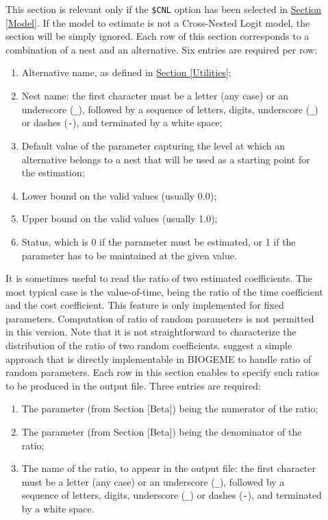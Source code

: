 \documentclass[12pt]{memoir}
\begin{document}
\begin{description}
   \item[]  This section is relevant only if the
      \verb+$CNL+ option has been selected in \hyperlink{Model}{Section [Model]}. If the model to estimate is not a Cross-Nested Logit model, the section will be
      simply ignored. 
      Each row of this section corresponds to a combination of a nest and an alternative. Six entries are required per row:
      \begin{enumerate}
         \item Alternative name, as defined in \hyperlink{Utilities}{Section [Utilities]};
         \item Nest name:   the first character must be a letter (any case) or an underscore
            (\verb+_+), followed by a sequence of letters, digits, underscore (\verb+_+)
            or dashes (\verb+-+), and terminated by a white space;
         \item Default value of the  parameter capturing the level at which an alternative belongs to a nest that will be used as a starting point for the estimation;
         \item Lower bound on the valid values (usually 0.0);
         \item Upper bound on the valid values (usually 1.0);
         \item Status, which is 0 if the parameter must be estimated, or 1 if the parameter has to be maintained at the given value. 
      \end{enumerate}

   \item[] It is sometimes useful to read the ratio of two
      estimated coefficients. The most typical case is the value-of-time, being the
      ratio of the time coefficient and the cost coefficient. This feature is only implemented for fixed parameters. 
      Computation of ratio of random parameters is not permitted in this version.  Note that it is not 
      straightforward to characterize the distribution of the ratio of two random coefficients.  
       suggest a simple approach that is directly implementable in BIOGEME
      to handle ratio of random parameters.
      Each row in this section enables to specify such ratios to be produced in the output
      file. Three entries are required:
      \begin{enumerate}
         \item The parameter (from Section [Beta]) being the numerator of the ratio;
         \item The parameter (from Section [Beta]) being the denominator of the ratio;
         \item The name of the ratio, to appear in the output file:  the first character must be a letter (any case) or an underscore
            (\verb+_+), followed by a sequence of letters, digits, underscore (\verb+_+)
            or dashes (\verb+-+), and terminated by a white space. 
      \end{enumerate}


\end{description}
\end{document}
